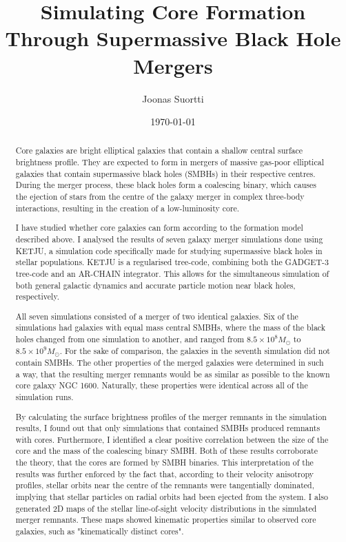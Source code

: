 \documentclass[english, twoside]{HYgradu}
\title{Simulating Core Formation Through Supermassive Black Hole Mergers}
\author{Joonas Suortti}
\date{\today}
\begin{document}
\maketitle

\onehalfspacing

\begin{abstract}
Core galaxies are bright elliptical galaxies that contain a shallow central surface brightness profile. They are expected to form in mergers of massive gas-poor elliptical galaxies that contain supermassive black holes (SMBHs) in their respective centres. During the merger process, these black holes form a coalescing binary, which causes the ejection of stars from the centre of the galaxy merger in complex three-body interactions, resulting in the creation of a low-luminosity core.

I have studied whether core galaxies can form according to the formation model described above. I analysed the results of seven galaxy merger simulations done using KETJU, a simulation code specifically made for studying supermassive black holes in stellar populations. KETJU is a regularised tree-code, combining both the GADGET-3 tree-code and an AR-CHAIN integrator. This allows for the simultaneous simulation of both general galactic dynamics and accurate particle motion near black holes, respectively.

All seven simulations consisted of a merger of two identical galaxies. Six of the simulations had galaxies with equal mass central SMBHs, where the mass of the black holes changed from one simulation to another, and ranged from $8.5 \times 10^8 M_\odot$ to $8.5 \times 10^9 M_\odot$. For the sake of comparison, the galaxies in the seventh simulation did not contain SMBHs. The other properties of the merged galaxies were determined in such a way, that the resulting merger remnants would be as similar as possible to the known core galaxy NGC 1600. Naturally, these properties were identical across all of the simulation runs. 

By calculating the surface brightness profiles of the merger remnants in the simulation results, I found out that only simulations that contained SMBHs produced remnants with cores. Furthermore, I identified a clear positive correlation between the size of the core and the mass of the coalescing binary SMBH. Both of these results corroborate the theory, that the cores are formed by SMBH binaries. This interpretation of the results was further enforced by the fact that, according to their velocity anisotropy profiles, stellar orbits near the centre of the remnants were tangentially dominated, implying that stellar particles on radial orbits had been ejected from the system. I also generated 2D maps of the stellar line-of-sight velocity distributions in the simulated merger remnants. These maps showed kinematic properties similar to observed core galaxies, such as "kinematically distinct cores".


\end{abstract}
\end{document}
